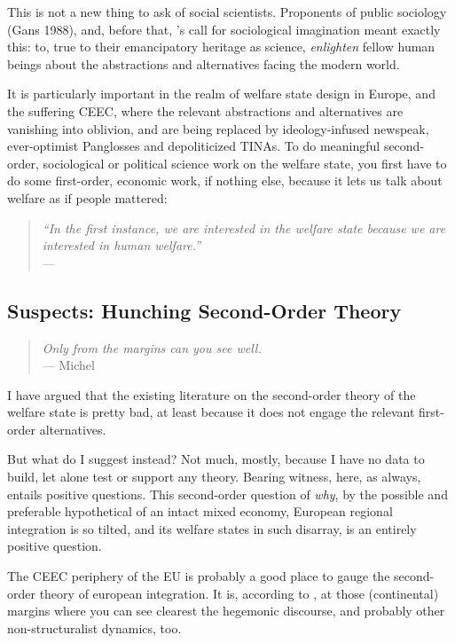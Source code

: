 \documentclass[11pt,a4paper,oneside]{article}
\begin{document}
This is not a new thing to ask of social scientists.
Proponents of public sociology (Gans 1988), and, before that, \citeauthor{Mills-1959-aa}'s call for sociological imagination meant exactly this:
to, true to their emancipatory heritage as science, \emph{enlighten} fellow human beings about the abstractions and alternatives facing the modern world.

It is particularly important in the realm of welfare state design in Europe, and the suffering \gls{CEEC}, where the relevant abstractions and alternatives are vanishing into oblivion, and are being replaced by ideology-infused newspeak, ever-optimist Panglosses and depoliticized TINAs.
To do meaningful second-order, sociological or political science work on the welfare state, you first have to do some first-order, economic work, if nothing else, because it lets us talk about welfare as if people mattered:
\begin{quote}
	\emph{``In the first instance, we are interested in the welfare state because we are interested in human welfare.''}\\
	--- \cite[236]{Haggard2009}
\end{quote}

\subsection[Suspects]{Suspects: Hunching Second-Order Theory}

\begin{quote}
	\emph{Only from the margins can you see well.}\\
	--- Michel \cite{Foucault-1972-aa}
\end{quote}

I have argued that the existing literature on the second-order theory of the welfare state is pretty bad, at least because it does not engage the relevant first-order alternatives.

But what do I suggest instead?
Not much, mostly, because I have no data to build, let alone test or support any theory.
Bearing witness, here, as always, entails positive questions.
This second-order question of \emph{why}, by the possible and preferable hypothetical of an intact mixed economy, European regional integration is so tilted, and its welfare states in such disarray, is an entirely positive question.

The \gls{CEEC} periphery of the \gls{EU} is probably a good place to gauge the second-order theory of european integration.
It is, according to \cite{Foucault-1972-aa}, at those (continental) margins where you can see clearest the hegemonic discourse, and probably other non-structuralist dynamics, too.
\end{document}
